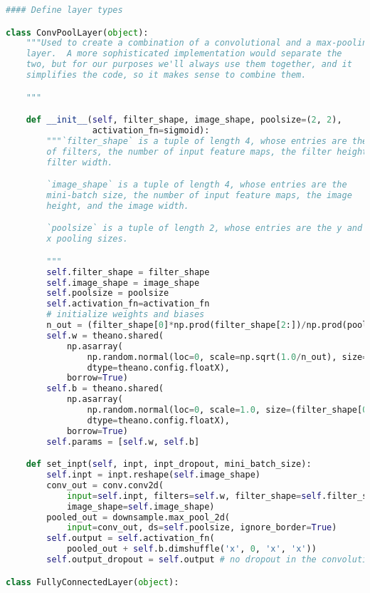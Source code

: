 \begin{fullwidth}
\begin{lstlisting}[caption={network3.py (Python 2.7)},label={lst:network3.py}, language=Python]
#### Define layer types

class ConvPoolLayer(object):
    """Used to create a combination of a convolutional and a max-pooling
    layer.  A more sophisticated implementation would separate the
    two, but for our purposes we'll always use them together, and it
    simplifies the code, so it makes sense to combine them.

    """

    def __init__(self, filter_shape, image_shape, poolsize=(2, 2),
                 activation_fn=sigmoid):
        """`filter_shape` is a tuple of length 4, whose entries are the number
        of filters, the number of input feature maps, the filter height, and the
        filter width.

        `image_shape` is a tuple of length 4, whose entries are the
        mini-batch size, the number of input feature maps, the image
        height, and the image width.

        `poolsize` is a tuple of length 2, whose entries are the y and
        x pooling sizes.

        """
        self.filter_shape = filter_shape
        self.image_shape = image_shape
        self.poolsize = poolsize
        self.activation_fn=activation_fn
        # initialize weights and biases
        n_out = (filter_shape[0]*np.prod(filter_shape[2:])/np.prod(poolsize))
        self.w = theano.shared(
            np.asarray(
                np.random.normal(loc=0, scale=np.sqrt(1.0/n_out), size=filter_shape),
                dtype=theano.config.floatX),
            borrow=True)
        self.b = theano.shared(
            np.asarray(
                np.random.normal(loc=0, scale=1.0, size=(filter_shape[0],)),
                dtype=theano.config.floatX),
            borrow=True)
        self.params = [self.w, self.b]

    def set_inpt(self, inpt, inpt_dropout, mini_batch_size):
        self.inpt = inpt.reshape(self.image_shape)
        conv_out = conv.conv2d(
            input=self.inpt, filters=self.w, filter_shape=self.filter_shape,
            image_shape=self.image_shape)
        pooled_out = downsample.max_pool_2d(
            input=conv_out, ds=self.poolsize, ignore_border=True)
        self.output = self.activation_fn(
            pooled_out + self.b.dimshuffle('x', 0, 'x', 'x'))
        self.output_dropout = self.output # no dropout in the convolutional layers

class FullyConnectedLayer(object):


\end{lstlisting}
\end{fullwidth}

